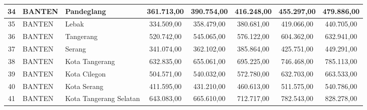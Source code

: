 \begin{spacing}{1.0}
\begin{longtable}{|c|p{2.2cm}|p{2.8cm}|c|c|c|c|c|}
34 & BANTEN & Pandeglang & 361.713,00 & 390.754,00 & 416.248,00 & 455.297,00 & 479.886,00 \\ \hline
35 & BANTEN & Lebak & 334.509,00 & 358.479,00 & 380.681,00 & 419.066,00 & 440.705,00 \\ \hline
36 & BANTEN & Tangerang & 520.742,00 & 545.065,00 & 576.122,00 & 604.362,00 & 632.941,00 \\ \hline
37 & BANTEN & Serang & 341.074,00 & 362.102,00 & 385.864,00 & 425.751,00 & 449.291,00 \\ \hline
38 & BANTEN & Kota Tangerang & 632.835,00 & 655.061,00 & 695.225,00 & 746.468,00 & 785.113,00 \\ \hline
39 & BANTEN & Kota Cilegon & 504.571,00 & 540.032,00 & 572.780,00 & 632.703,00 & 663.533,00 \\ \hline
40 & BANTEN & Kota Serang & 411.595,00 & 431.210,00 & 460.613,00 & 511.575,00 & 540.786,00 \\ \hline
41 & BANTEN & Kota Tangerang Selatan & 643.083,00 & 665.610,00 & 712.717,00 & 782.543,00 & 828.278,00 \\ \hline
\end{longtable}
\end{spacing}
\newpage
